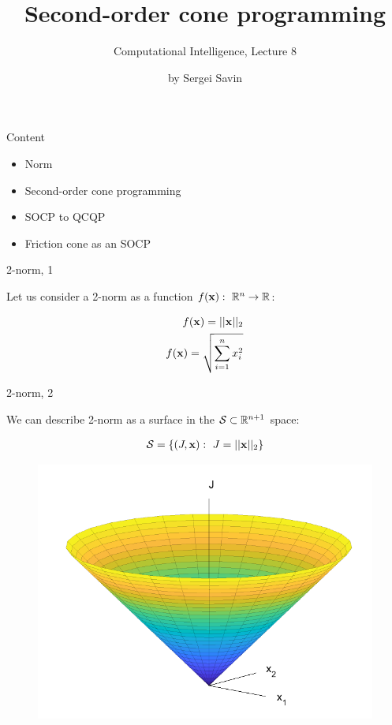 \documentclass{beamer}
\title{Second-order cone programming}
\subtitle{Computational Intelligence, Lecture 8}
\author{by Sergei Savin}
\date{\mydate}
\begin{document}
\maketitle


\begin{frame}{Content}

\begin{itemize}
	\item  Norm
\item  Second-order cone programming
\item  SOCP to QCQP
\item  Friction cone as an SOCP
\end{itemize}

\end{frame}






\begin{frame}{2-norm, 1}
	\begin{flushleft}
		
		Let us consider a 2-norm as a function $f(\mathbf{x}): \ \mathbb{R}^n \rightarrow \mathbb{R}$:
		
		\begin{align}
			f(\mathbf{x}) = || \mathbf{x} ||_2
			\\
			f(\mathbf{x}) = \sqrt{ \sum_{i=1}^n x_i^2 }
		\end{align}
		
	\end{flushleft}
\end{frame}


\begin{frame}{2-norm, 2}
	\begin{flushleft}
		
		We can describe 2-norm as a surface in the $\mathcal S \subset \mathbb{R}^{n+1}$ space:
		
		\begin{align}
			\mathcal S = \{  (J, \mathbf{x}): \ J = || \mathbf{x} ||_2 \}
		\end{align}		
		
		\begin{figure}
			\centering
			\includegraphics[width=0.7\linewidth]{norm}
			\label{fig:norm}
		\end{figure}
		
	\end{flushleft}
\end{frame}
\end{document}
